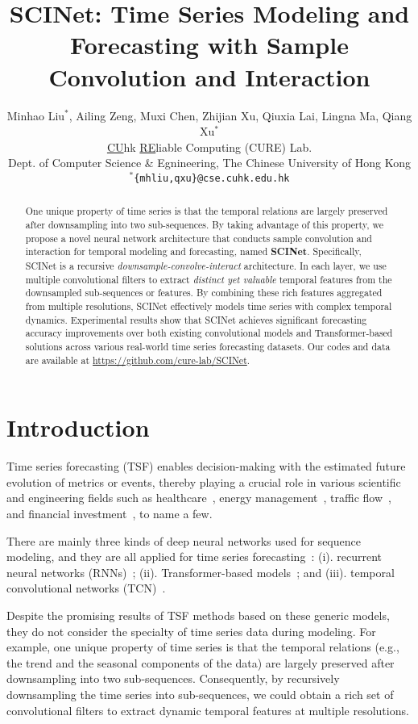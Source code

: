 \documentclass{article}
\title{SCINet: Time Series Modeling and Forecasting with Sample Convolution and Interaction}
\author{Minhao Liu$^{*}$,  Ailing Zeng, Muxi Chen, Zhijian Xu, Qiuxia Lai, Lingna Ma, Qiang Xu$^{*}$ \\
\underline{CU}hk \underline{RE}liable Computing (CURE) Lab.\\
Dept. of Computer Science \& Egnineering, The Chinese University of Hong Kong\\
$^{*}$\texttt{\{mhliu,qxu\}@cse.cuhk.edu.hk} \\
}
\begin{document}
\maketitle

\begin{abstract}
One unique property of time series is that the temporal relations are largely preserved after downsampling into two sub-sequences. By taking advantage of this property, we propose a novel neural network architecture that conducts sample convolution and interaction for temporal modeling and forecasting, named \textbf{SCINet}. Specifically, SCINet is a recursive \emph{downsample-convolve-interact} architecture. In each layer, we use multiple convolutional filters to extract \emph{distinct yet valuable} temporal features from the downsampled sub-sequences or features. By combining these rich features aggregated from multiple resolutions, SCINet effectively models time series with complex temporal dynamics. Experimental results show that SCINet achieves significant forecasting accuracy improvements over both existing convolutional models and Transformer-based solutions across various real-world time series forecasting datasets. Our codes and data are available at \url{https://github.com/cure-lab/SCINet}.
\end{abstract}



\section{Introduction}
Time series forecasting (TSF) enables decision-making with the estimated future evolution of metrics or events, thereby playing a crucial role in various scientific and engineering fields such as healthcare~\citep{Bahadori2019TemporalClusteringII}, energy management~\citep{Zhou2020InformerBE}, traffic flow~\citep{Zhou2020InformerBE}, and financial investment~\citep{DUrso2019TrimmedFC}, to name a few.

There are mainly three kinds of deep neural networks used for sequence modeling, and they are all applied for time series forecasting~\citep{Lim2021TimeseriesFW}: (i). recurrent neural networks (RNNs)~\citep{Hochreiter1997LongSM}; (ii). Transformer-based models~\citep{vaswani2017attention}; and (iii). temporal convolutional networks (TCN)~\citep{Bai2018AnEE}.

Despite the promising results of TSF methods based on these generic models, they do not consider the specialty of time series data during modeling.
For example, one unique property of time series is that the temporal relations (e.g., the trend and the seasonal components of the data) are largely preserved after downsampling into two sub-sequences. Consequently, by recursively downsampling the time series into sub-sequences, we could obtain a rich set of convolutional filters to extract dynamic temporal features at multiple resolutions. 
\end{document}
